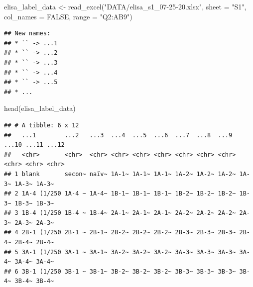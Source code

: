 \documentclass[
]{book}
\newenvironment{Shaded}{\begin{snugshade}}{\end{snugshade}}
\newcommand{\AttributeTok}[1]{\textcolor[rgb]{0.77,0.63,0.00}{#1}}
\newcommand{\ConstantTok}[1]{\textcolor[rgb]{0.00,0.00,0.00}{#1}}
\newcommand{\FunctionTok}[1]{\textcolor[rgb]{0.00,0.00,0.00}{#1}}
\newcommand{\NormalTok}[1]{#1}
\newcommand{\OtherTok}[1]{\textcolor[rgb]{0.56,0.35,0.01}{#1}}
\newcommand{\StringTok}[1]{\textcolor[rgb]{0.31,0.60,0.02}{#1}}
\begin{document}
\begin{Shaded}
\begin{Highlighting}[]
\NormalTok{elisa\_label\_data }\OtherTok{\textless{}{-}} \FunctionTok{read\_excel}\NormalTok{(}\StringTok{"DATA/elisa\_s1\_07{-}25{-}20.xlsx"}\NormalTok{, }\AttributeTok{sheet =} \StringTok{"S1"}\NormalTok{, }\AttributeTok{col\_names =} \ConstantTok{FALSE}\NormalTok{,  }\AttributeTok{range =} \StringTok{"Q2:AB9"}\NormalTok{)}
\end{Highlighting}
\end{Shaded}

\begin{verbatim}
## New names:
## * `` -> ...1
## * `` -> ...2
## * `` -> ...3
## * `` -> ...4
## * `` -> ...5
## * ...
\end{verbatim}

\begin{Shaded}
\begin{Highlighting}[]
\FunctionTok{head}\NormalTok{(elisa\_label\_data)}
\end{Highlighting}
\end{Shaded}

\begin{verbatim}
## # A tibble: 6 x 12
##   ...1        ...2   ...3  ...4  ...5  ...6  ...7  ...8  ...9  ...10 ...11 ...12
##   <chr>       <chr>  <chr> <chr> <chr> <chr> <chr> <chr> <chr> <chr> <chr> <chr>
## 1 blank       secon~ naïv~ 1A-1~ 1A-1~ 1A-1~ 1A-2~ 1A-2~ 1A-2~ 1A-3~ 1A-3~ 1A-3~
## 2 1A-4 (1/250 1A-4 ~ 1A-4~ 1B-1~ 1B-1~ 1B-1~ 1B-2~ 1B-2~ 1B-2~ 1B-3~ 1B-3~ 1B-3~
## 3 1B-4 (1/250 1B-4 ~ 1B-4~ 2A-1~ 2A-1~ 2A-1~ 2A-2~ 2A-2~ 2A-2~ 2A-3~ 2A-3~ 2A-3~
## 4 2B-1 (1/250 2B-1 ~ 2B-1~ 2B-2~ 2B-2~ 2B-2~ 2B-3~ 2B-3~ 2B-3~ 2B-4~ 2B-4~ 2B-4~
## 5 3A-1 (1/250 3A-1 ~ 3A-1~ 3A-2~ 3A-2~ 3A-2~ 3A-3~ 3A-3~ 3A-3~ 3A-4~ 3A-4~ 3A-4~
## 6 3B-1 (1/250 3B-1 ~ 3B-1~ 3B-2~ 3B-2~ 3B-2~ 3B-3~ 3B-3~ 3B-3~ 3B-4~ 3B-4~ 3B-4~
\end{verbatim}
\end{document}
